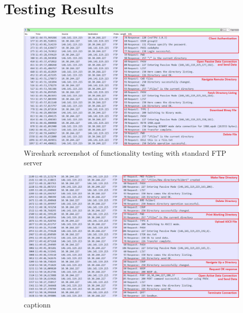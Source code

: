 \documentclass[10pt,twocolumn]{witseiepaper}
\begin{document}
\begin{appendix}
\begin{tabular}{|l|l|l|}
\end{tabular} 


\section{Testing Results}\label{sec:wireshark}

\begin{figure}[h]
	\centering
	\includegraphics[width=1\columnwidth]{WitsCaptureAnno1.png}
	\caption{Wireshark screenshot of functionality testing with standard FTP server}
	\raggedright
	\label{fig:WitsWS1}
\end{figure}

\begin{figure}[h]
\centering
\includegraphics[width=1\columnwidth]{WitsServerCapture2.png}
\caption{captionn}
\raggedright
\label{fig:WitsWS2}
\end{figure}

\end{appendix}

\end{document}
